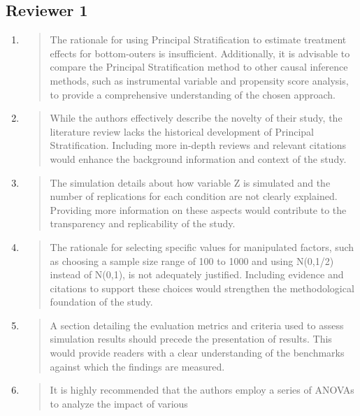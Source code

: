 \documentclass[]{article}
\begin{document}
\subsection{Reviewer 1}
\begin{enumerate}

  \item \begin{quote}The rationale for using Principal Stratification to estimate treatment
effects for bottom-outers is insufficient. Additionally, it is
advisable to compare the Principal Stratification method to other
causal inference methods, such as instrumental variable and propensity score analysis, to provide a comprehensive understanding of the chosen
approach.
\end{quote}
\item \begin{quote}
    While the authors effectively describe the novelty of their study, the literature review lacks the historical
development of Principal Stratification. Including more in-depth reviews and relevant citations would enhance the
background information and context of the study.
\end{quote}
\item
\begin{quote}
  The simulation details about how variable Z is simulated and the number of replications for each condition
are not clearly explained. Providing more information on these aspects would contribute to the transparency and replicability
of the study.
\end{quote}
\item \begin{quote}
    The rationale for selecting specific values for manipulated factors, such as choosing a sample size range of
100 to 1000 and using N(0,1/2) instead of N(0,1), is not adequately justified. Including evidence and citations to support
these choices would strengthen the methodological foundation of the
study.
\end{quote}
\item \begin{quote}
    A section detailing the evaluation metrics and criteria used to assess simulation results should precede the
presentation of results. This would provide readers with a clear understanding of the benchmarks against which the findings
are measured.
\end{quote}
\item
 \begin{quote} It is highly recommended that the authors employ a series of ANOVAs to analyze the impact of various

\end{quote}
\end{enumerate}
\end{document}
